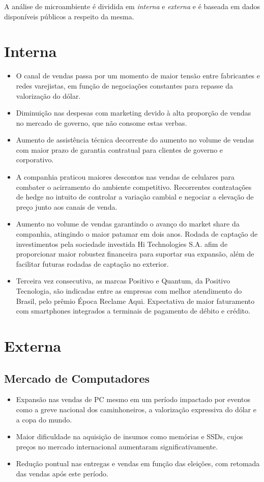 \label{chap:micro}
A análise de microambiente é dividida em \emph{interna} e \emph{externa} e é baseada em dados disponíveis públicos a respeito da mesma\cite{positivo2t18}\cite{reclameAqui2018}.

\section{Interna}

\begin{itemize}
\item O canal de vendas passa por um momento de maior tensão entre fabricantes e redes varejistas, em função de negociações constantes para repasse da valorização do dólar.
\item Diminuição nas despesas com marketing devido à alta proporção de vendas no mercado de governo, que não consome estas verbas.
\item Aumento de assistência técnica decorrente do aumento no volume de vendas com maior prazo de garantia contratual para clientes de governo e corporativo.
\item A companhia praticou maiores descontos nas vendas de celulares para combater o acirramento do ambiente competitivo.
Recorrentes contratações de hedge no intuito de controlar a variação cambial e negociar a elevação de preço junto aos canais de venda.
\item Aumento no volume de vendas garantindo o avanço do market share da companhia, atingindo o maior patamar em dois anos.
Rodada de captação de investimentos pela sociedade investida Hi Technologies S.A. afim de proporcionar maior robustez financeira para suportar sua expansão, além de facilitar futuras rodadas de captação no exterior.
\item Terceira vez consecutiva, as marcas Positivo e Quantum, da Positivo Tecnologia, são indicadas entre as empresas com melhor atendimento do Brasil, pelo prêmio Época Reclame Aqui.
Expectativa de maior faturamento com smartphones integrados a terminais de pagamento de débito e crédito.

\end{itemize}

\section{Externa}
\subsection{Mercado de Computadores}
\begin{itemize}
\item Expansão nas vendas de PC mesmo em um período impactado por eventos como a greve nacional dos caminhoneiros, a valorização expressiva do dólar e a copa do mundo.
\item Maior dificuldade na aquisição de insumos como memórias e SSDs, cujos preços no mercado internacional aumentaram significativamente.
\item Redução pontual nas entregas e vendas em função das eleições, com retomada das vendas após este período.
\end{itemize}

